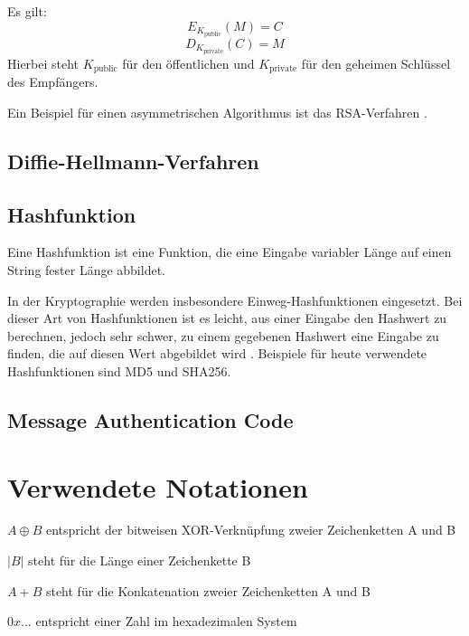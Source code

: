 Es gilt: 
\[E_{K_{\text{public}}}(M)=C\] 
\[D_{K_{\text{private}}}(C)=M\] 
Hierbei steht \(K_{\text{public}}\) für den öffentlichen und \(K_{\text{private}}\) für den geheimen Schlüssel des Empfängers.

Ein Beispiel für einen asymmetrischen Algorithmus ist das RSA-Verfahren \cite{Schneier2006}.

\subsection{Diffie-Hellmann-Verfahren}

\subsection{Hashfunktion}

Eine Hashfunktion ist eine Funktion, die eine Eingabe variabler Länge auf einen String fester Länge abbildet.

In der Kryptographie werden insbesondere Einweg-Hashfunktionen eingesetzt. Bei dieser Art von Hashfunktionen ist es leicht, aus einer Eingabe den Hashwert zu berechnen, jedoch sehr schwer, zu einem gegebenen Hashwert eine Eingabe zu finden, die auf diesen Wert abgebildet wird \cite{Schneier2006}. Beispiele für heute verwendete Hashfunktionen sind MD5 und SHA256.

\subsection{Message Authentication Code}

\label{sec_mac}

\section{Verwendete Notationen}

\(A \oplus B\) entspricht der bitweisen XOR-Verknüpfung zweier Zeichenketten A und B

\(|B|\) steht für die Länge einer Zeichenkette B

\(A + B\) steht für die Konkatenation zweier Zeichenketten A und B

\(0x\dots\) entspricht einer Zahl im hexadezimalen System

